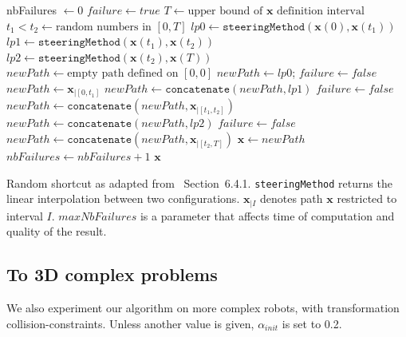 \documentclass{tADR2e}
\newcommand\xx{\mathbf{x}}
\begin{document}
\begin{algorithm}
\begin{algorithmic}[1] %
\Procedure{randomShortcut}{$\xx$}
   \State nbFailures $\gets 0$
        \State $failure \gets true$
        \State $T \gets \mbox{upper bound of }\xx\mbox{ definition interval}$
        \State $t_1 < t_2 \gets \mbox{random numbers in }[0,T]$
        \State $lp0 \gets \texttt{steeringMethod} (\xx(0), \xx(t_1))$
        \State $lp1 \gets \texttt{steeringMethod} (\xx(t_1), \xx(t_2))$
        \State $lp2 \gets \texttt{steeringMethod} (\xx(t_2), \xx(T))$
        \State $newPath \gets \mbox{empty path defined on }[0,0]$
          \State $newPath \gets lp0$; $failure \gets false$
        \Else
          \State $newPath \gets \xx_{|[0,t_1]}$
        \EndIf
          \State $newPath \gets \texttt{concatenate} (newPath, lp1)$
          \State $failure \gets false$
        \Else
          \State $newPath \gets \texttt{concatenate} (newPath, \xx_{|[t_1,t_2]})$
        \EndIf
          \State $newPath \gets \texttt{concatenate} (newPath, lp2)$
          \State $failure \gets false$
        \Else
          \State $newPath \gets \texttt{concatenate} (newPath, \xx_{|[t_2,T]})$
        \EndIf
        \State $\xx \gets newPath$
         $nbFailures \gets nbFailures + 1$
        \EndIf
      \EndWhile
    \Return $\xx$
\EndProcedure
\end{algorithmic}
\caption{Random shortcut as adapted from~\cite{Sekhavat-Svestka1998} 
Section~6.4.1. \texttt{steeringMethod} returns the linear interpolation between 
two configurations. $\xx_{|I}$ denotes path $\xx$ restricted to interval $I$. 
$maxNbFailures$ is a parameter that affects time of computation and quality of 
the result.}\label{algo:random-shortcut}
\end{algorithm}

\subsection{To 3D complex problems}

We also experiment our algorithm on more complex robots, with transformation 
collision-constraints. Unless another value is given, $\alpha_{init}$ is set to 0.2.

\end{document}

